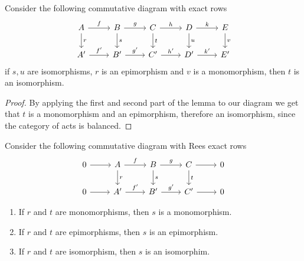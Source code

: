 \begin{corollary}
    Consider the following commutative diagram with exact rows
    \[\begin{tikzcd}
        A & B & C & D & E \\
        {A'} & {B'} & {C'} & {D'} & {E'}
        \arrow["f", from=1-1, to=1-2]
        \arrow["r", from=1-1, to=2-1]
        \arrow["g", from=1-2, to=1-3]
        \arrow["s", from=1-2, to=2-2]
        \arrow["h", from=1-3, to=1-4]
        \arrow["t", from=1-3, to=2-3]
        \arrow["k", from=1-4, to=1-5]
        \arrow["u", from=1-4, to=2-4]
        \arrow["v", from=1-5, to=2-5]
        \arrow["{f'}", from=2-1, to=2-2]
        \arrow["{g'}", from=2-2, to=2-3]
        \arrow["{h'}", from=2-3, to=2-4]
        \arrow["{k'}", from=2-4, to=2-5]
    \end{tikzcd}\]
    if $s,u$ are isomorphisms, $r$ is an epimorphism and $v$ is a monomorphism, then $t$ is an isomorphism.
\end{corollary}
\begin{proof}[Proof]
    By applying the first and second part of the lemma to our diagram we 
    get that $t$ is a monomorphism and an epimorphism, therefore an isomorphism, 
    since the category of acts is balanced.
\end{proof}
\begin{corollary}
    Consider the following commutative diagram with Rees exact rows
    \[\begin{tikzcd}
        0 & A & B & C & 0 \\
        0 & {A'} & {B'} & {C'} & 0
        \arrow[from=1-1, to=1-2]
        \arrow["f", from=1-2, to=1-3]
        \arrow["r", from=1-2, to=2-2]
        \arrow["g", from=1-3, to=1-4]
        \arrow["s", from=1-3, to=2-3]
        \arrow[from=1-4, to=1-5]
        \arrow["t", from=1-4, to=2-4]
        \arrow[from=2-1, to=2-2]
        \arrow["{f'}", from=2-2, to=2-3]
        \arrow["{g'}", from=2-3, to=2-4]
        \arrow[from=2-4, to=2-5]
    \end{tikzcd}\]
    \begin{enumerate}
        \item If $r$ and $t$ are monomorphisms, then $s$ is a monomorphism.
        \item If $r$ and $t$ are epimorphisms, then $s$ is an epimorphism.
        \item If $r$ and $t$ are isomorphism, then $s$ is an isomorphim. 
    \end{enumerate}
\end{corollary}
